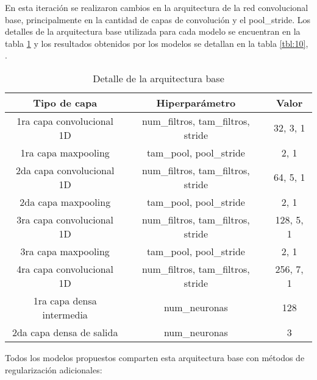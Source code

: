 En esta iteración se realizaron cambios en la arquitectura de la red convolucional base, principalmente en la cantidad de capas de convolución y el pool\_stride. Los detalles de la arquitectura base utilizada para cada modelo se encuentran en la tabla \ref{tbl:9} y los resultados obtenidos por los modelos se detallan en la tabla \ref{tbl:10}, .

\begin{table}[!ht]
	\centering
	\begin{tabular}{|c|c|c|}
		\hline
		\textbf{Tipo de capa} & \textbf{Hiperparámetro} & \textbf{Valor} \\ \hline
		1ra capa convolucional 1D & num\_filtros, tam\_filtros, stride & 32, 3, 1 \\ \hline
		1ra capa maxpooling & tam\_pool, pool\_stride & 2, 1 \\ \hline
		2da capa convolucional 1D & num\_filtros, tam\_filtros, stride & 64, 5, 1 \\ \hline
		2da capa maxpooling & tam\_pool, pool\_stride & 2, 1 \\ \hline
		3ra capa convolucional 1D & num\_filtros, tam\_filtros, stride & 128, 5, 1 \\ \hline
		3ra capa maxpooling & tam\_pool, pool\_stride & 2, 1 \\ \hline
		4ra capa convolucional 1D & num\_filtros, tam\_filtros, stride & 256, 7, 1 \\ \hline
		1ra capa densa intermedia & num\_neuronas & 128 \\ \hline
		2da capa densa de salida & num\_neuronas & 3 \\ \hline
	\end{tabular}
	\caption{Detalle de la arquitectura base}
	\label{tbl:9}
\end{table}

Todos los modelos propuestos comparten esta arquitectura base con métodos de regularización adicionales:

